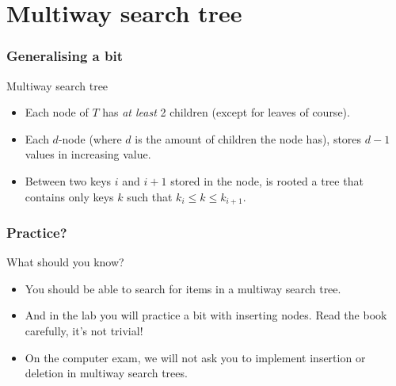 \section{Multiway search tree}
\label{sec:multiway_search_tree}

\begin{frame}
	\frametitle{Generalising a bit}
		\begin{block}{Multiway search tree}
			\begin{itemize}
				\item Each node of $T$ has \textit{at least} 2 children (except for leaves of course).
				\item Each $d$-node (where $d$ is the amount of children the node has), stores $d-1$ values in increasing value.
				\item Between two keys $i$ and $i+1$ stored in the node, is rooted a tree that contains only keys $k$ such that
					$k_i \leq k \leq k_{i+1}$.
			\end{itemize}
			
		\end{block}	

	
\end{frame}

\begin{frame}
	\frametitle{Practice?}
	
		\begin{block}{What should you know?}
			\begin{itemize}
				\item You should be able to search for items in a multiway search tree.
				\item And in the lab you will practice a bit with inserting nodes. Read the book carefully, it's not trivial!
				\item On the computer exam, we will not ask you to implement insertion or deletion in multiway search trees.
			\end{itemize}
		\end{block}	
\end{frame}

